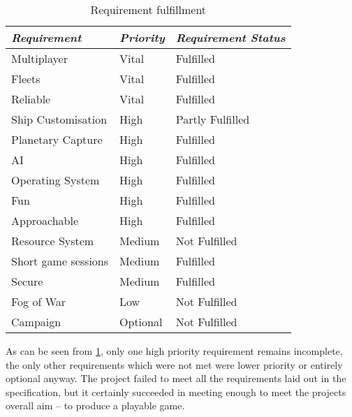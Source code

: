 \begin{table}[ht]
	\caption{Requirement fulfillment}
	\begin{tabular}{p{10em} p{6em} p{12em}}
		\toprule
		\emph{Requirement} & \emph{Priority} & \emph{Requirement Status}\\
		\midrule
   Multiplayer & Vital & Fulfilled\\
	Fleets & Vital &  Fulfilled \\
	Reliable & Vital & Fulfilled\\
	
	Ship Customisation & High & Partly Fulfilled\\
   Planetary Capture & High & Fulfilled \\
   AI & High & Fulfilled \\
	
   Operating System & High & Fulfilled\\
	Fun & High & Fulfilled\\
	Approachable & High & Fulfilled\\
	Resource System & Medium & Not Fulfilled \\
	Short game sessions & Medium & Fulfilled\\
   Secure & Medium & Fulfilled\\
	Fog of War & Low & Not Fulfilled \\
	Campaign & Optional & Not Fulfilled\\

	\bottomrule
	\end{tabular}
	\label{tab:requrementstable}
\end{table}

\vspace{5mm}

As can be seen from \ref{tab:requrementstable}, only one high priority requirement remains incomplete, the only other requirements which were not met were lower priority or entirely optional anyway. The project failed to meet all the requirements laid out in the specification, but it certainly succeeded in meeting enough to meet the projects overall aim -- to produce a playable game.
